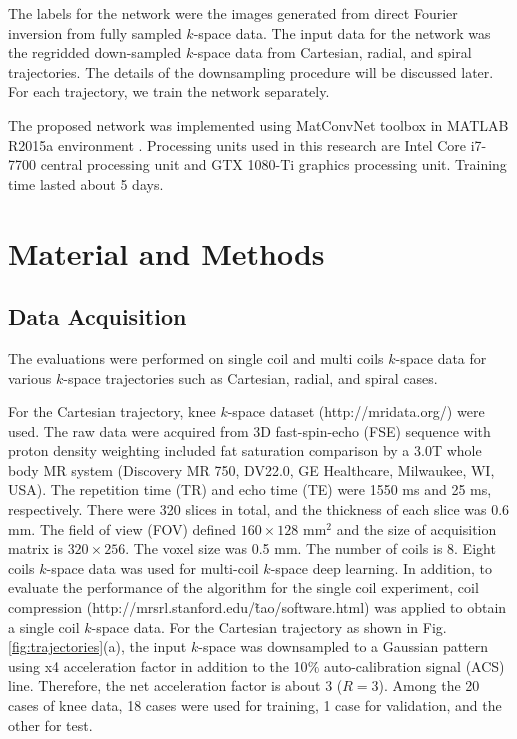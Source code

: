 \documentclass[10pt,journal]{IEEEtran}
\newcommand{\0}{{\boldsymbol{0}}}
\begin{document}
The labels for the network were the images generated from direct Fourier inversion from
fully sampled $k$-space data. The input data for the network was the regridded down-sampled $k$-space data from Cartesian, radial, and spiral trajectories.
The details of the downsampling procedure will be discussed later.
 For each trajectory, we train the network separately. 



The proposed network was implemented using MatConvNet toolbox in MATLAB R2015a environment \cite{vedaldi2015matconvnet}. 
Processing units used in this research are Intel Core i7-7700 central processing unit and GTX 1080-Ti graphics processing unit. Training time lasted about 5 days.
 


\section{Material and Methods}

\subsection{Data Acquisition}

The evaluations were performed on single coil and multi coils $k$-space data for various $k$-space trajectories
 such as Cartesian, radial, and spiral cases. 

For the Cartesian trajectory, knee $k$-space dataset (http://mridata.org/) were used. The raw data were acquired from 3D fast-spin-echo (FSE) sequence with proton density weighting included fat saturation comparison by a 3.0T whole body MR system (Discovery MR 750, DV22.0, GE Healthcare, Milwaukee, WI, USA). The repetition time (TR) and echo time (TE) were 1550 ms and 25 ms, respectively. There were 320 slices in total, and the thickness of each slice was 0.6 mm. The field of view (FOV) defined $160 \times 128$ mm$^2$ and the size of acquisition matrix is $320 \times 256$. The voxel size was 0.5 mm. The number of coils is 8. Eight coils $k$-space data was used for multi-coil $k$-space deep learning. 
In addition, to evaluate the performance of the algorithm  for the single coil experiment,  coil compression (http://mrsrl.stanford.edu/\~tao/software.html) was applied to obtain a single coil $k$-space data. 
For the Cartesian trajectory as shown in Fig. \ref{fig:trajectories}(a), the input $k$-space was downsampled to a Gaussian pattern using x4 acceleration factor in addition to the 10$\%$ auto-calibration signal (ACS) line. Therefore, the net acceleration factor is about 3 ($R=3$). 
Among the 20  cases of knee data,  18 cases were used for training, 1 case for validation, and the other for test.
\end{document}
